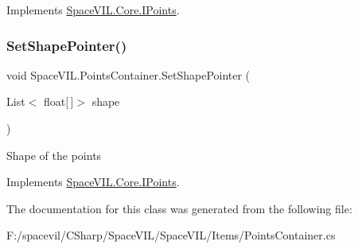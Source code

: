 Implements \mbox{\hyperlink{interface_space_v_i_l_1_1_core_1_1_i_points}{Space\+V\+I\+L.\+Core.\+I\+Points}}.

\mbox{\label{class_space_v_i_l_1_1_points_container_a0694fefae0c13a4006608adc71c9f706}} 
\subsubsection{\texorpdfstring{Set\+Shape\+Pointer()}{SetShapePointer()}}
{\footnotesize\ttfamily void Space\+V\+I\+L.\+Points\+Container.\+Set\+Shape\+Pointer (\begin{DoxyParamCaption}\item[{List$<$ float\mbox{[}$\,$\mbox{]}$>$}]{shape }\end{DoxyParamCaption})}



Shape of the points 



Implements \mbox{\hyperlink{interface_space_v_i_l_1_1_core_1_1_i_points}{Space\+V\+I\+L.\+Core.\+I\+Points}}.



The documentation for this class was generated from the following file\+:\begin{DoxyCompactItemize}
\item 
F\+:/spacevil/\+C\+Sharp/\+Space\+V\+I\+L/\+Space\+V\+I\+L/\+Items/Points\+Container.\+cs\end{DoxyCompactItemize}
